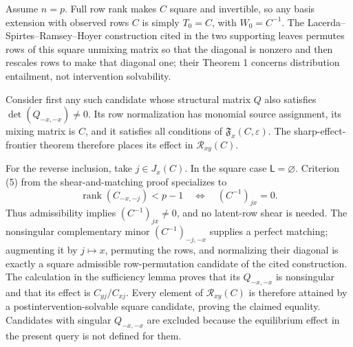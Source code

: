 Assume \(n=p\). Full row rank makes \(C\) square and invertible, so any basis extension with observed rows \(C\) is simply \(T_0=C\), with \(W_0=C^{-1}\). The Lacerda--Spirtes--Ramsey--Hoyer construction cited in the two supporting leaves permutes rows of this square unmixing matrix so that the diagonal is nonzero and then rescales rows to make that diagonal one; their Theorem 1 concerns distribution entailment, not intervention solvability.

Consider first any such candidate whose structural matrix \(Q\) also satisfies \(\det(Q_{-x,-x})\ne0\). Its row normalization has monomial source assignment, its mixing matrix is \(C\), and it satisfies all conditions of \(\mathfrak F_x(C,\varepsilon)\). The sharp-effect-frontier theorem therefore places its effect in \(\mathcal R_{xy}(C)\).

For the reverse inclusion, take \(j\in J_x(C)\). In the square case \(\mathsf L=\varnothing\). Criterion (5) from the shear-and-matching proof specializes to
\[
 \operatorname{rank}(C_{-x,-j})<p-1
 \quad\Longleftrightarrow\quad (C^{-1})_{jx}=0.
\]
Thus admissibility implies \((C^{-1})_{jx}\ne0\), and no latent-row shear is needed. The nonsingular complementary minor \((C^{-1})_{-j,-x}\) supplies a perfect matching; augmenting it by \(j\mapsto x\), permuting the rows, and normalizing their diagonal is exactly a square admissible row-permutation candidate of the cited construction. The calculation in the sufficiency lemma proves that its \(Q_{-x,-x}\) is nonsingular and that its effect is \(C_{yj}/C_{xj}\). Every element of \(\mathcal R_{xy}(C)\) is therefore attained by a postintervention-solvable square candidate, proving the claimed equality. Candidates with singular \(Q_{-x,-x}\) are excluded because the equilibrium effect in the present query is not defined for them.
